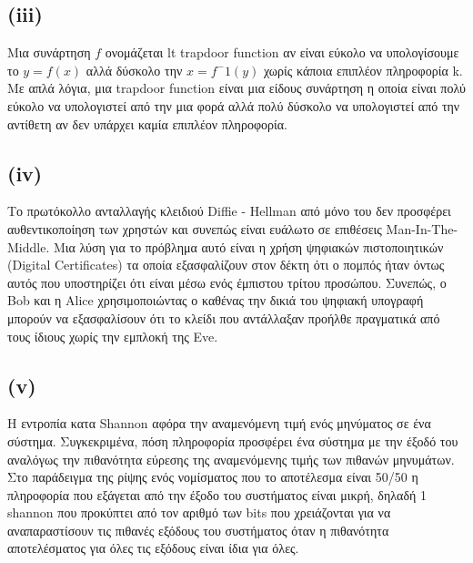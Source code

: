\documentclass[a4paper, 11pt]{article}
\newcommand{\lt}{\latintext}
\begin{document}
\subsection*{({\lt iii})} Μια συνάρτηση $ f $ ονομάζεται {lt trapdoor function} αν είναι εύκολο να υπολογίσουμε το $ y = f(x) $ αλλά δύσκολο την $ x = f^-1(y) $ χωρίς κάποια επιπλέον πληροφορία {\lt k}. Με απλά λόγια, μια {\lt trapdoor function} είναι μια είδους συνάρτηση η οποία είναι πολύ εύκολο να υπολογιστεί από την μια φορά αλλά πολύ δύσκολο να υπολογιστεί από την αντίθετη αν δεν υπάρχει καμία επιπλέον πληροφορία.


\subsection*{({\lt iv})} Το πρωτόκολλο ανταλλαγής κλειδιού {\lt Diffie - Hellman} από μόνο του δεν προσφέρει αυθεντικοποίηση των χρηστών και συνεπώς είναι ευάλωτο σε επιθέσεις {\lt Man-In-The-Middle}. Μια λύση για το πρόβλημα αυτό είναι η χρήση ψηφιακών πιστοποιητικών ({\lt Digital Certificates}) τα οποία εξασφαλίζουν στον δέκτη ότι ο πομπός ήταν όντως αυτός που υποστηρίζει ότι είναι μέσω ενός έμπιστου τρίτου προσώπου. Συνεπώς, ο {\lt Bob} και η {\lt Alice} χρησιμοποιώντας ο καθένας την δικιά του ψηφιακή υπογραφή μπορούν να εξασφαλίσουν ότι το κλείδι που αντάλλαξαν προήλθε πραγματικά από τους ίδιους χωρίς την εμπλοκή της {\lt Eve}.


\subsection*{({\lt v})} Η εντροπία κατα {\lt Shannon} αφόρα την αναμενόμενη τιμή ενός μηνύματος σε ένα σύστημα. Συγκεκριμένα, πόση πληροφορία προσφέρει ένα σύστημα με την έξοδό του αναλόγως την πιθανότητα εύρεσης της αναμενόμενης τιμής των πιθανών μηνυμάτων. Στο παράδειγμα της ρίψης ενός νομίσματος που το αποτέλεσμα είναι 50/50 η πληροφορία που εξάγεται από την έξοδο του συστήματος είναι μικρή, δηλαδή 1 {\lt shannon} που προκύπτει από τον αριθμό των {\lt bits} που χρειάζονται για να αναπαραστίσουν τις πιθανές εξόδους του συστήματος όταν η πιθανότητα αποτελέσματος για όλες τις εξόδους είναι ίδια για όλες.
\end{document}
